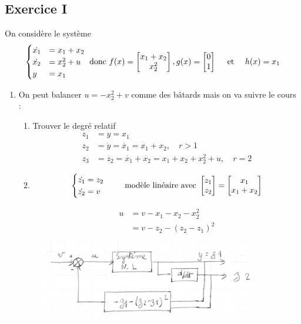 \documentclass{../../td}{subfiles}
\begin{document}
\subsection*{Exercice I}

On considère le système 
\[
  \begin{cases}
\dot{x_1} & = x_1 +x_2\\
\dot{x_2} & = x_2^2 + u\\
y & = x_1
\end{cases}
\text{ donc } f(x) = \begin{bmatrix} x_1+x_2\\x_2^2 \end{bmatrix}, g(x) = \begin{bmatrix} 0 \\ 1 \end{bmatrix} \quad\text{ et }\quad h(x) = x_1 \]

\begin{enumerate}
\item On peut balancer $u=-x_2^2 + v$ comme des bâtards mais on va suivre le cours :

\begin{enumerate}
\item Trouver le degré relatif
\begin{align*}
z_1 & = y = x_1 \\
z_2 & = \dot{y} = \dot{x_1} = x_1 + x_2, \quad r>1\\
z_3 & = \dot{z_2} = \dot{x_1} + \dot{x_2} = x_1 + x_2 + x_2^2 + u, \quad r=2
\end{align*}

\item
\[
  \begin{cases}
\dot{z_1} = z_2\\
\dot{z_2} = v
\end{cases}
\quad \text{ modèle linéaire avec } \begin{bmatrix} z_1 \\ z_2 \end{bmatrix} = \begin{bmatrix} x_1 \\ x_1 + x_2 \end{bmatrix} \]

\begin{align*}
u & = v - x_1 - x_2 - x_2^2 \\
& = v - z_2 - ( z_2 - z_1 )^2
\end{align*}
\end{enumerate}
\begin{figure}[ht]
  \centering
  \includegraphics[width=0.9\textwidth]{1}
  \caption{ }
  \label{fig:label}
\end{figure}


\end{enumerate}
\end{document}
